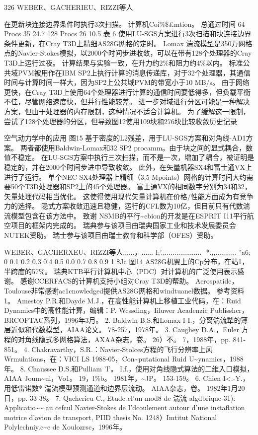 \documentclass[UTF8,11pt,a4paper,openany,fontset=fandol]{ctexbook}
\begin{document}
326 WEBER、GACHERIEU、RIZZI等人

在更新块连接边界条件时执行3次扫描。 计算机Coi\%\$£mtion。 总通过时间 64 Procs 35 24.7 128 Procs 26 10.5 表 6 使用LU-SGS方案进行3次扫描和块连接边界条件更新，在Cray T3D上精细AS28G网格的定时。 Lomax 湍流模型是350万网格点的Navier-Stokes模拟，以2000个时间步进收敛，可以在带有128个处理器的Cray T3D上运行过夜。 计算结果与实验一致，在升力约2\%和阻力约4\%以内。 标准公共域PVM被用作在IBM SP2上执行计算的消息传递库，对于32个处理器，其通信时间与计算时间一样大，因为SP2上公共域PVM的带宽小于10 MB/s。 由于网络更快，在Cray T3D上使用64个处理器进行计算的通信时间要低得多，但负载平衡不佳，尽管网络速度快，但并行性能较差。 进一步对域进行分区可能是一种解决方案，但由于处理器的内存限制，这种情况不适合计算机。 为了缓解这一限制，尝试了128个处理器的分区，但导致图12使用109块和276块比较收敛历史记录

空气动力学中的应用 图15 基于密度的L2残差，用于LU-SGS方案和对角线-AD1方案。 两者都使用Baldwin-Lomax和32 SP2 procamm。由于块之间的显式耦合，数值不稳定。 在LU-SGS方案中执行三次扫描，而不是一次，增加了耦合，被证明是稳定的，并在2000个时间步进中导致收敛。 此外，在矢量机器SX4和富士通VX上进行了运行。 单个NEC SX4处理器上精细（3.5 Mpoints）网格的计算时间大约需要50个T3D处理器和SP2上的45个处理器。 富士通VX的相同数字分别为34和32，矢量处理代码相当优化。 这使得使用现代矢量计算机在价格/性能方面成为有竞争力的选择。 隐式方案收敛迅速且稳健，运行的CFL数为10亿，但目前只有代数湍流模型包含在该方法中。 致谢 NSMB的平行\textasciitilde{}ebion的开发是在ESPRIT I11平行航空项目的框架内完成的。 瑞典参与该项目由瑞典国家工业和技术发展委员会NUTEK资助。 瑞士参与该项目由瑞士教育和科学部（OFES）资助。

WEBER、GACHERXEU、RIZZI等人......，...... I;'.,................... -*.,,........... "a6; 0 0.1 0.2 0.3 0.4 0.5 0.0 0.7 0.8 0.9 1 \$Jc 图14 AS28G机翼上的Cp分布，在站1，半跨度的57\%。 瑞典KTB平行计算机中心（PDC）对计算机的广泛使用表示感谢。 感谢CCERFACS的计算机支持小组对Cray T3D的帮助。 Aerospatide，Toulouse非常感谢ac1cnowledged提供AS28G网格和windtuanel数据。 参考资料1。 Amestoy P.R.和Dayde M.J.，在高性能计算机上移植工业代码，在：Ruid Dynamics中的高性能计算，编辑：P. Wcssding，Iiluwer Acadenzic Publisshcr，BRCOPTAC系列，1996年3月。 2. Baldwin B.S.和Lomax I-I.，分离湍流犁的薄层近似和代数模型，AIAA论文。 78-257，1978年。 3. Caughey D.A.，Euler 方程的对角线隐式多网格算法，AXAA杂志，卷。 26）不。 7，1988年，pp. 841-851。 4. Chakravarthy，S.R.：Navier-Stolces方程的飞行分辨率上风Wrmulations，在：VICI LS 1988-05，Con\textasciitilde{}putational Ruid U\textasciitilde{}ynamics，1988年。 8. Chaussee D.S.和Pulliam 'I'。 I.f.，使用对角线隐式算法的二维入口模拟，AIAA Joum\textasciitilde{}ul，Vo1。 19，l\%b。 1981年，\textasciitilde{}JP。 153-159。 6. Chien I<.-Y.，用低雷诺数* 湍流模型预测通道和边界层流动。 AIAA杂志，卷。 1982年1月20日，pp. 33-38。 7. Qacherieu C., Etude cl'un mod8 de 湍流 algdbrique 31): Applicatio\textasciitilde{}\textasciitilde{} au cefcul Navier-Stokes de I'dcoulement autour d'une instaflation motrice d'avion de transport, PIID thesis No. 1248）Imtitut National Polylechniy.c\textasciitilde{}e de Xoulozrsc，1996年。
\end{document}
